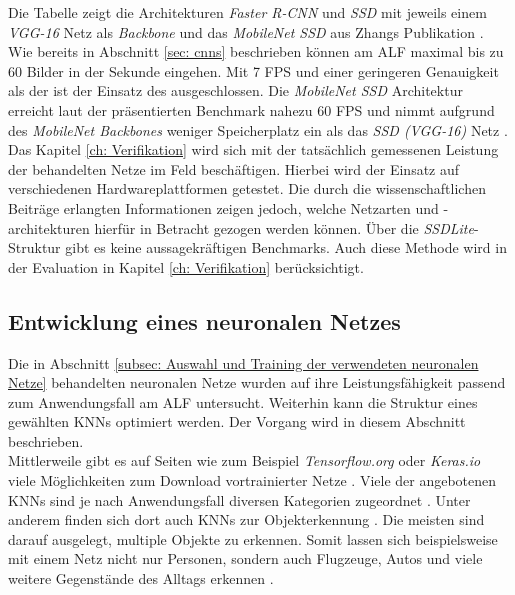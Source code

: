 		Die Tabelle zeigt die Architekturen \textit{Faster R-CNN} und \textit{SSD} mit jeweils einem \textit{VGG-16} Netz als \textit{Backbone} und das \textit{MobileNet SSD} aus Zhangs Publikation \cite{embedded}. Wie bereits in Abschnitt \ref{sec: cnns} beschrieben können am ALF maximal bis zu 60 Bilder in der Sekunde eingehen. Mit 7 FPS und einer geringeren Genauigkeit als der  ist der Einsatz des  ausgeschlossen. Die \textit{MobileNet SSD} Architektur erreicht laut der präsentierten Benchmark nahezu 60 FPS und nimmt aufgrund des \textit{MobileNet Backbones} weniger Speicherplatz ein als das \textit{SSD (VGG-16)} Netz \cite{leightweight}. \\ 
		
		Das Kapitel \ref{ch: Verifikation} wird sich mit der tatsächlich gemessenen Leistung der behandelten Netze im Feld beschäftigen. Hierbei wird der Einsatz auf verschiedenen Hardwareplattformen getestet. Die durch die wissenschaftlichen Beiträge erlangten Informationen zeigen jedoch, welche Netzarten und -architekturen hierfür in Betracht gezogen werden können. Über die \textit{SSDLite}-Struktur gibt es keine aussagekräftigen Benchmarks. Auch diese Methode wird in der Evaluation in Kapitel \ref{ch: Verifikation} berücksichtigt.
		
		\subsection{Entwicklung eines neuronalen Netzes}
		\label{subsec: Entwickeltes neuronales Netz}
		
		Die in Abschnitt \ref{subsec: Auswahl und Training der verwendeten neuronalen Netze} behandelten neuronalen Netze wurden auf ihre Leistungsfähigkeit passend zum Anwendungsfall am ALF untersucht. Weiterhin kann die Struktur eines gewählten KNNs optimiert werden. Der Vorgang wird in diesem Abschnitt beschrieben.\\
		
		Mittlerweile gibt es auf Seiten wie zum Beispiel \textit{Tensorflow.org} oder \textit{Keras.io} viele Möglichkeiten zum Download vortrainierter Netze \cite{tensorflow}. Viele der angebotenen KNNs sind je nach Anwendungsfall diversen Kategorien zugeordnet \cite{tensorflow}. Unter anderem finden sich dort auch KNNs zur Objekterkennung \cite{tensorflow}. Die meisten sind darauf ausgelegt, multiple Objekte zu erkennen. Somit lassen sich beispielsweise mit einem Netz nicht nur Personen, sondern auch Flugzeuge, Autos und viele weitere Gegenstände des Alltags erkennen \cite{tensorflow}. \\ 
		
